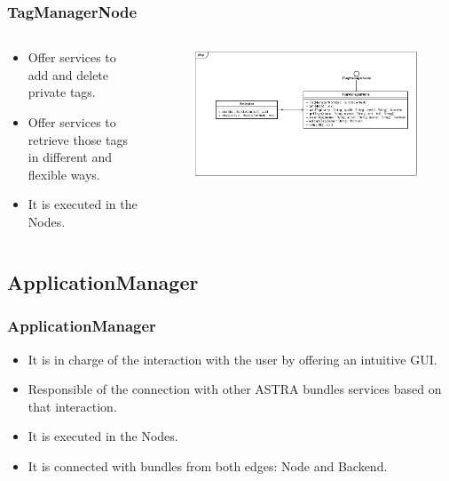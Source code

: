 \begin{frame}
\frametitle{TagManagerNode}

\begin{columns}

	\begin{column}{6cm}
	
	
	\begin{itemize}
		\item Offer services to add and delete private tags.
		\item Offer services to retrieve those tags in different and 
			flexible ways.
		\item It is executed in the Nodes.

	\end{itemize}
		
	
	\end{column}
	
		\begin{column}{7cm}
	    
			\begin{figure}
			 	\includegraphics[scale=0.2]{img/TagManagerNodeClassDiagram.png}
			\end{figure}
	    
	    \end{column}
	
\end{columns}

\end{frame}

\subsection{ApplicationManager}

\begin{frame}
\frametitle{ApplicationManager}

	\begin{itemize}
		\item It is in charge of the interaction with the user by offering an
		intuitive GUI.
		\item Responsible of the connection with other ASTRA bundles services based
		on that interaction.	
		\item It is executed in the Nodes.
		\item It is connected with bundles from both edges: Node and Backend.
	\end{itemize}

\end{frame}

